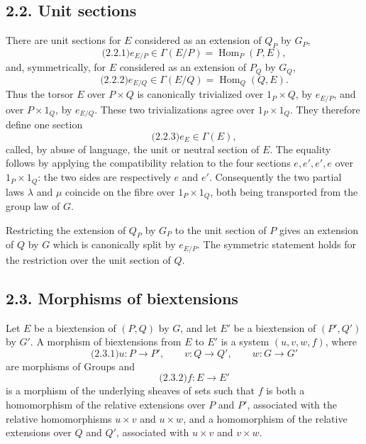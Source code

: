 \documentclass[11pt]{article}
\begin{document}
\subsection*{2.2. Unit sections}
There are unit sections for \(E\) considered as an extension of \(Q_P\) by \(G_P\),
\begin{equation}\qquad\text{(2.2.1)}
  e_{E/P}\in \Gamma(E/P)=\operatorname{Hom}_P(P,E),
\end{equation}
and, symmetrically, for \(E\) considered as an extension of \(P_Q\) by \(G_Q\),
\begin{equation}\qquad\text{(2.2.2)}
  e_{E/Q}\in \Gamma(E/Q)=\operatorname{Hom}_Q(Q,E).
\end{equation}
Thus the torsor \(E\) over \(P\times Q\) is canonically trivialized over \(1_P\times Q\), by \(e_{E/P}\), and over \(P\times1_Q\), by \(e_{E/Q}\).  These two trivializations agree over \(1_P\times1_Q\).  They therefore define one section
\begin{equation}\qquad\text{(2.2.3)}
  e_E\in\Gamma(E),
\end{equation}
called, by abuse of language, the unit or neutral section of \(E\).  The equality follows by applying the compatibility relation to the four sections \(e,e',e',e\) over \(1_P\times1_Q\): the two sides are respectively \(e\) and \(e'\).  Consequently the two partial laws \(\lambda\) and \(\mu\) coincide on the fibre over \(1_P\times1_Q\), both being transported from the group law of \(G\).

Restricting the extension of \(Q_P\) by \(G_P\) to the unit section of \(P\) gives an extension of \(Q\) by \(G\) which is canonically split by \(e_{E/P}\).  The symmetric statement holds for the restriction over the unit section of \(Q\).

\subsection*{2.3. Morphisms of biextensions}
Let \(E\) be a biextension of \((P,Q)\) by \(G\), and let \(E'\) be a biextension of \((P',Q')\) by \(G'\).  A morphism of biextensions from \(E\) to \(E'\) is a system \((u,v,w,f)\), where
\begin{equation}\qquad\text{(2.3.1)}
  u:P\to P',\qquad v:Q\to Q',\qquad w:G\to G'
\end{equation}
are morphisms of Groups and
\begin{equation}\qquad\text{(2.3.2)}
  f:E\to E'
\end{equation}
is a morphism of the underlying sheaves of sets such that \(f\) is both a homomorphism of the relative extensions over \(P\) and \(P'\), associated with the relative homomorphisms \(u\times v\) and \(u\times w\), and a homomorphism of the relative extensions over \(Q\) and \(Q'\), associated with \(u\times v\) and \(v\times w\).
\end{document}
